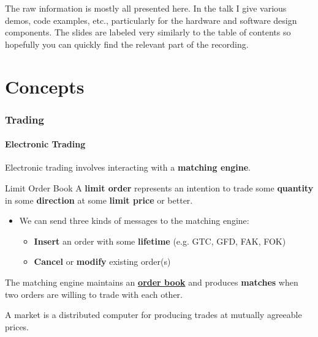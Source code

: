 \documentclass{article}
\newcommand{\sectionquote}[1]{%
    \def\insertsquote{\small #1}%
}
\newcommand{\insertsquote}{}
\renewcommand{\insertsquote}{}%
\begin{document}
The raw information is mostly all presented here. In the talk I give various demos, code examples, etc., particularly for the hardware and software design components. The slides are labeled very similarly to the table of contents so hopefully you can quickly find the relevant part of the recording.

\newpage

\setcounter{tocdepth}{3}
\tableofcontents

\part{Concepts}
\sectionquote{``All economic activity is carried out through time. Every individual economic process occupies a certain time, and all linkages between economic processes necessarily involve longer or shorter periods of time.'' Friedrich Hayek}
\section{Trading}

\subsection{Electronic Trading}
Electronic trading involves interacting with a \textbf{matching engine}.
\begin{block}{Limit Order Book}
	A \textbf{limit order} represents an intention to trade some \textbf{quantity} in some \textbf{direction} at some \textbf{limit price} or better.


	\begin{itemize}
	\item We can send three kinds of messages to the matching engine:
	\begin{itemize}
	\item \textbf{Insert} an order with some \textbf{lifetime} (e.g. GTC, GFD, FAK, FOK)
	\item \textbf{Cancel} or \textbf{modify} existing order(s)
	\end{itemize}
	\end{itemize}

	The matching engine maintains an \href{https://www.binance.com/en-AU/trade/BTC_USDT}{\textbf{order book}} and produces \textbf{matches} when two orders are willing to trade with each other.
\end{block}

A market is a distributed computer for producing trades at mutually agreeable prices.
\end{document}
